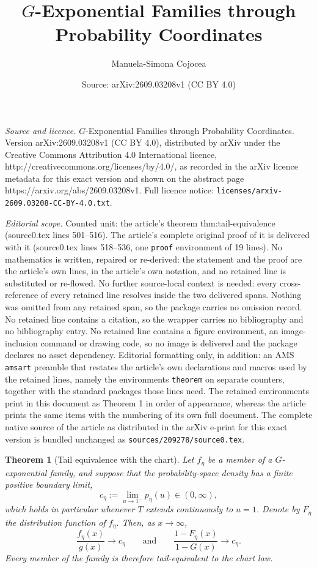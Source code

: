 \documentclass[10pt,a4paper]{amsart}
\title{$G$-Exponential Families through Probability Coordinates}
\author{Manuela-Simona Cojocea}
\date{Source: arXiv:2609.03208v1 (CC BY 4.0)}
\newtheorem{theorem}{Theorem}
\begin{document}
\maketitle

\noindent\emph{Source and licence.} $G$-Exponential Families through Probability Coordinates. Version arXiv:2609.03208v1 (CC BY 4.0), distributed by arXiv under the Creative Commons Attribution 4.0 International licence, http://creativecommons.org/licenses/by/4.0/, as recorded in the arXiv licence metadata for this exact version and shown on the abstract page https://arxiv.org/abs/2609.03208v1. Full licence notice: \texttt{licenses/arxiv-2609.03208-CC-BY-4.0.txt}.\par\smallskip

\noindent\textit{Editorial scope.} Counted unit: the article's theorem thm:tail-equivalence (source0.tex lines 501--516). The article's complete original proof of it is delivered with it (source0.tex lines 518--536, one \texttt{proof} environment of 19 lines). No mathematics is written, repaired or re-derived: the statement and the proof are the article's own lines, in the article's own notation, and no retained line is substituted or re-flowed.  No further source-local context is needed: every cross-reference of every retained line resolves inside the two delivered spans.  Nothing was omitted from any retained span, so the package carries no omission record.  No retained line contains a citation, so the wrapper carries no bibliography and no bibliography entry.  No retained line contains a figure environment, an image-inclusion command or drawing code, so no image is delivered and the package declares no asset dependency.  Editorial formatting only, in addition: an AMS \texttt{amsart} preamble that restates the article's own declarations and macros used by the retained lines, namely the environments \texttt{theorem} on separate counters, together with the standard packages those lines need.  The retained environments print in this document as Theorem 1 in order of appearance, whereas the article prints the same items with the numbering of its own full document.  The complete native source of the article as distributed in the arXiv e-print for this exact version is bundled unchanged as \texttt{sources/209278/source0.tex}.
\begin{theorem}[Tail equivalence with the chart]\label{thm:tail-equivalence}
Let $f_\eta$ be a member of a $G$-exponential family, and suppose that the
probability-space density has a finite positive boundary limit,
\[
c_\eta:=\lim_{u\to1^-}p_\eta(u)\in(0,\infty),
\]
which holds in particular whenever $T$ extends continuously to $u=1$.
Denote by $F_\eta$ the distribution function of $f_\eta$. Then, as
$x\to\infty$,
\[
\frac{f_\eta(x)}{g(x)}\longrightarrow c_\eta
\qquad\text{and}\qquad
\frac{1-F_\eta(x)}{1-G(x)}\longrightarrow c_\eta .
\]
Every member of the family is therefore tail-equivalent to the chart law.
\end{theorem}
\end{document}
